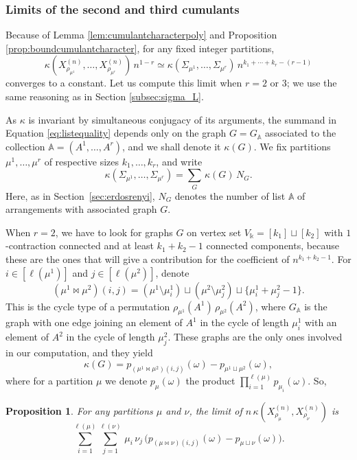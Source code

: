 \documentclass[12pt,a4paper,reqno]{amsart}
\newtheorem{proposition}[lemma]{Proposition}
\theoremstyle{remark}
\renewcommand{\AA}{\mathbb{A}}
\newcommand{\SubGraph}{X^{(n)}}
\begin{document}
\subsubsection{Limits of the second and third cumulants}\label{subsubsec:limitchar_K2K3}
Because of Lemma \ref{lem:cumulantcharacterpoly} and Proposition \ref{prop:boundcumulantcharacter}, for any fixed integer partitions, $$\kappa\left(\SubGraph_{\rho_{\mu^{1}}},\dots,\SubGraph_{\rho_{\mu^{r}}}\right)\,n^{1-r}\simeq \kappa\left(\varSigma_{\mu^{1}},\ldots,\varSigma_{\mu^{r}}\right)\,n^{k_{1}+\cdots+k_{r}-(r-1)}$$ converges to a constant. Let us compute this limit when $r=2$ or $3$; we use the same reasoning as in Section \ref{subsec:sigma_L}.\bigskip

As $\kappa$ is invariant by simultaneous conjugacy of its arguments, the summand in Equation \eqref{eq:listequality} depends only on the graph $G=G_{\AA}$ associated to the collection $\AA=(A^1,\dots,A^r)$, and we shall denote it $\kappa(G)$.  We fix partitions $\mu^{1},\ldots,\mu^{r}$ of respective sizes $k_{1},\ldots,k_{r}$, and write $$\kappa(\varSigma_{\mu^{1}},\ldots,\varSigma_{\mu^{r}})=\sum_{G}\, \kappa(G)\,N_{G}.$$ 
Here, as in Section~\ref{sec:erdosrenyi}, $N_G$ denotes the number of list $\AA$ of arrangements with associated graph $G$.\medskip

When $r=2$, we have to look for graphs $G$ on vertex set $V_{\Bbbk}=[k_{1}]\sqcup [k_{2}]$ with $1$-contraction connected and at least $k_{1}+k_{2}-1$ connected components, because these are the ones that will give a contribution for the coefficient of $n^{k_{1}+k_{2}-1}$. For $i \in [\ell(\mu^{1})]$ and $j \in [\ell(\mu^{2})]$, denote $$(\mu^{1} \Join \mu^{2} )(i,j)=(\mu^{1} \setminus \mu_{i}^{1})\sqcup(\mu^{2} \setminus \mu_{j}^{2}) \sqcup \{\mu_{i}^{1}+\mu_{j}^{2}-1\}.$$ This is the cycle type of a permutation $\rho_{\mu^{1}}(A^{1})\,\rho_{\mu^{2}}(A^{2})$, where $G_{\AA}$ is the graph with one edge joining an element of $A^{1}$ in the cycle of length $\mu^{1}_{i}$ with an element of $A^{2}$ in the cycle of length $\mu^{2}_{j}$. These graphs are the only ones involved in our computation, and they yield 
$$\kappa(G)=p_{(\mu^{1} \Join \mu^{2} )(i,j)}(\omega)-p_{\mu^{1}\sqcup\mu^{2}}(\omega),$$
where for a partition $\mu$ we denote $p_{\mu}(\omega)$ the product $\prod_{i=1}^{\ell(\mu)}p_{\mu_{i}}(\omega)$. So,

\begin{proposition}
For any partitions $\mu$ and $\nu$, the limit of $n\,\kappa(\SubGraph_{\rho_\mu},\SubGraph_{\rho_\nu})$ is 
$$\sum_{i=1}^{\ell(\mu)}\sum_{j=1}^{\ell(\nu)} \,\mu_{i}\,\nu_{j}\,\big(p_{(\mu\Join \nu)(i,j)}(\omega)-p_{\mu\sqcup\nu}(\omega)\big).$$
\end{proposition}
\end{document}
